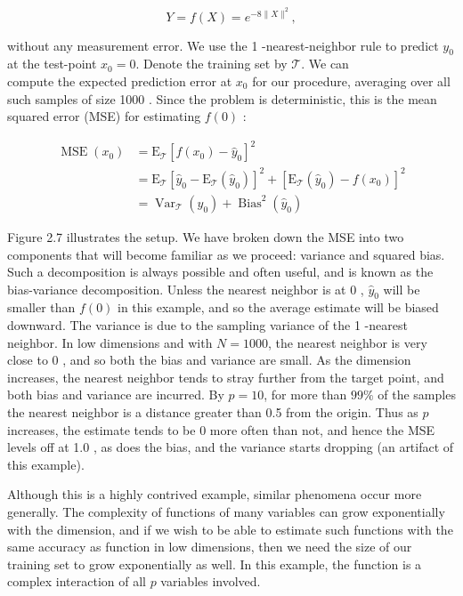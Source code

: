 \documentclass[10pt]{article}
\begin{document}
$$
Y=f(X)=e^{-8\|X\|^{2}},
$$

without any measurement error. We use the 1 -nearest-neighbor rule to predict $y_{0}$ at the test-point $x_{0}=0$. Denote the training set by $\mathcal{T}$. We can\\
compute the expected prediction error at $x_{0}$ for our procedure, averaging over all such samples of size 1000 . Since the problem is deterministic, this is the mean squared error (MSE) for estimating $f(0)$ :


\begin{align*}
\operatorname{MSE}\left(x_{0}\right) & =\mathrm{E}_{\mathcal{T}}\left[f\left(x_{0}\right)-\hat{y}_{0}\right]^{2} \\
& =\mathrm{E}_{\mathcal{T}}\left[\hat{y}_{0}-\mathrm{E}_{\mathcal{T}}\left(\hat{y}_{0}\right)\right]^{2}+\left[\mathrm{E}_{\mathcal{T}}\left(\hat{y}_{0}\right)-f\left(x_{0}\right)\right]^{2} \\
& =\operatorname{Var}_{\mathcal{T}}\left(\hat{y}_{0}\right)+\operatorname{Bias}^{2}\left(\hat{y}_{0}\right) \tag{2.25}
\end{align*}


Figure 2.7 illustrates the setup. We have broken down the MSE into two components that will become familiar as we proceed: variance and squared bias. Such a decomposition is always possible and often useful, and is known as the bias-variance decomposition. Unless the nearest neighbor is at 0 , $\hat{y}_{0}$ will be smaller than $f(0)$ in this example, and so the average estimate will be biased downward. The variance is due to the sampling variance of the 1 -nearest neighbor. In low dimensions and with $N=1000$, the nearest neighbor is very close to 0 , and so both the bias and variance are small. As the dimension increases, the nearest neighbor tends to stray further from the target point, and both bias and variance are incurred. By $p=10$, for more than $99 \%$ of the samples the nearest neighbor is a distance greater than 0.5 from the origin. Thus as $p$ increases, the estimate tends to be 0 more often than not, and hence the MSE levels off at 1.0 , as does the bias, and the variance starts dropping (an artifact of this example).

Although this is a highly contrived example, similar phenomena occur more generally. The complexity of functions of many variables can grow exponentially with the dimension, and if we wish to be able to estimate such functions with the same accuracy as function in low dimensions, then we need the size of our training set to grow exponentially as well. In this example, the function is a complex interaction of all $p$ variables involved.
\end{document}
